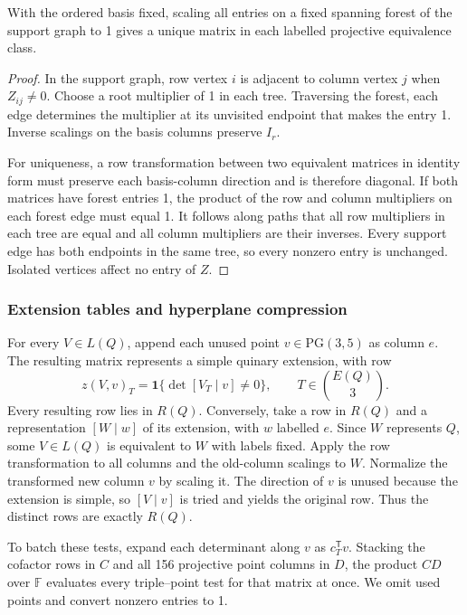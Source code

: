 \documentclass[11pt,letterpaper,titlepage]{article}
\def\F{\mathbb{F}}
\begin{document}
\begin{lemma}
\label{lem:method-normalization}
With the ordered basis fixed, scaling all entries on a fixed spanning forest of the support graph to 1 gives a unique matrix in each labelled projective equivalence class.
\end{lemma}
\begin{proof}
In the support graph, row vertex \(i\) is adjacent to column vertex \(j\) when \(Z_{ij}\ne 0\). Choose a root multiplier of 1 in each tree. Traversing the forest, each edge determines the multiplier at its unvisited endpoint that makes the entry 1. Inverse scalings on the basis columns preserve \(I_r\).

For uniqueness, a row transformation between two equivalent matrices in identity form must preserve each basis-column direction and is therefore diagonal. If both matrices have forest entries 1, the product of the row and column multipliers on each forest edge must equal 1. It follows along paths that all row multipliers in each tree are equal and all column multipliers are their inverses. Every support edge has both endpoints in the same tree, so every nonzero entry is unchanged. Isolated vertices affect no entry of \(Z\).
\end{proof}

\subsubsection{Extension tables and hyperplane compression}

For every \(V\in L(Q)\), append each unused point \(v\in\mathrm{PG}(3,5)\) as column \(e\). The resulting matrix represents a simple quinary extension, with row
\[
 z(V,v)_T=\mathbf{1}\{\det[V_T\mid v]\ne0\},
 \qquad T\in\binom{E(Q)}{3}.
\]
Every resulting row lies in \(R(Q)\). Conversely, take a row in \(R(Q)\) and a representation \([W\mid w]\) of its extension, with \(w\) labelled \(e\). Since \(W\) represents \(Q\), some \(V\in L(Q)\) is equivalent to \(W\) with labels fixed. Apply the row transformation to all columns and the old-column scalings to \(W\). Normalize the transformed new column \(v\) by scaling it. The direction of \(v\) is unused because the extension is simple, so \([V\mid v]\) is tried and yields the original row. Thus the distinct rows are exactly \(R(Q)\).

To batch these tests, expand each determinant along \(v\) as \(c_T^{\mathsf T}v\). Stacking the cofactor rows in \(C\) and all 156 projective point columns in \(D\), the product \(CD\) over \(\F\) evaluates every triple--point test for that matrix at once. We omit used points and convert nonzero entries to 1.
\end{document}
